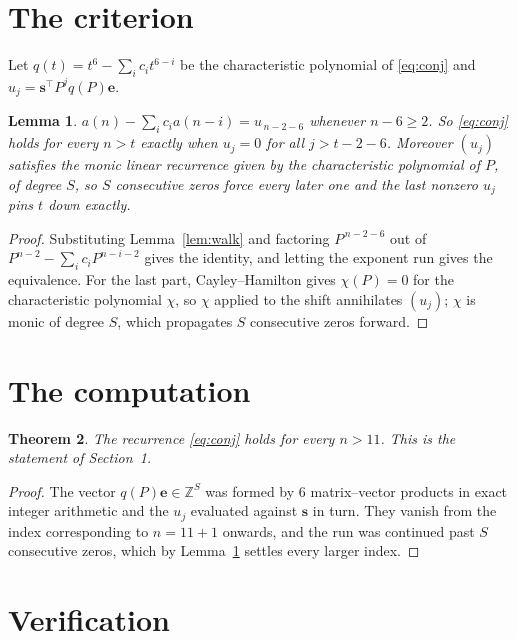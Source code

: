 \documentclass[11pt,a4paper]{article}
\theoremstyle{plain}
\newtheorem{theorem}{Theorem}
\newtheorem{lemma}[theorem]{Lemma}
\theoremstyle{definition}
\begin{document}
\section{The criterion}

Let $q(t)=t^{6}-\sum_i c_i t^{6-i}$ be the characteristic polynomial of
\eqref{eq:conj} and $u_j=\mathbf{s}^{\!\top}P^{j}q(P)\mathbf{e}$.

\begin{lemma}\label{lem:crit}
$a(n)-\sum_i c_i a(n-i)=u_{\,n-2-6}$ whenever $n-6\ge2$. So \eqref{eq:conj}
holds for every $n>t$ exactly when $u_j=0$ for all $j>t-2-6$. Moreover $(u_j)$
satisfies the monic linear recurrence given by the characteristic polynomial of $P$, of
degree $S$, so $S$ consecutive zeros force every later one and the last nonzero $u_j$ pins
$t$ down exactly.
\end{lemma}

\begin{proof}
Substituting Lemma~\ref{lem:walk} and factoring $P^{\,n-2-6}$ out of
$P^{n-2}-\sum_i c_i P^{n-i-2}$ gives the identity, and letting the exponent run gives the
equivalence. For the last part, Cayley--Hamilton gives $\chi(P)=0$ for the characteristic
polynomial $\chi$, so $\chi$ applied to the shift annihilates $(u_j)$; $\chi$ is monic of
degree $S$, which propagates $S$ consecutive zeros forward.
\end{proof}

\section{The computation}

\begin{theorem}
The recurrence \eqref{eq:conj} holds for every $n>11$. This is the statement of
Section~1.
\end{theorem}

\begin{proof}
The vector $q(P)\mathbf{e}\in\mathbb{Z}^{S}$ was formed by $6$ matrix--vector
products in exact integer arithmetic and the $u_j$ evaluated against $\mathbf{s}$ in turn.
They vanish from the index corresponding to $n=11+1$ onwards, and the run was continued
past $S$ consecutive zeros, which by Lemma~\ref{lem:crit} settles every larger index.
\end{proof}

\section{Verification}
\end{document}
